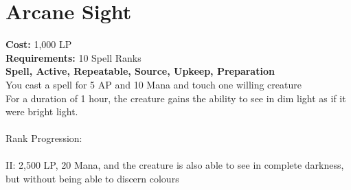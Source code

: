 \section{Arcane Sight}\label{spell:arcaneSight}
\textbf{Cost:} 1,000 LP\\
\textbf{Requirements:} 10 Spell Ranks\\
\textbf{Spell, Active, Repeatable, Source, Upkeep, Preparation}\\
You cast a spell for 5 AP and 10 Mana and touch one willing creature\\
For a duration of 1 hour, the creature gains the ability to see in dim light as if it were bright light.\\
\\
Rank Progression:\\
\\
II: 2,500 LP, 20 Mana, and the creature is also able to see in complete darkness, but without being able to discern colours\\